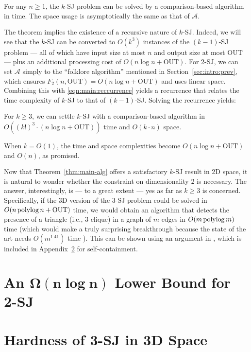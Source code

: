 \documentclass[sigconf]{acmart}
\def\vgap{\vspace{0mm}}
\def\A{\mathcal{A}}
\def\out{\mathrm{OUT}}
\begin{document}
\begin{theorem} \label{thm:main-recur}
    For any $n \ge 1$, the $k$-SJ problem can be solved by a comparison-based algorithm in
    \myeqn{
        O(k^3) \cdot \big( F_{k-1}(n, \out) + n \log n + \out \big)
        \label{eqn:main:reccurrence}
    }
    time.
    The space usage is asymptotically the same as that of $\A$.
\end{theorem}

The theorem implies the existence of a recursive nature of $k$-SJ. Indeed, we will see that the $k$-SJ can be converted to $O(k^3)$ instances of the $(k-1)$-SJ problem --- all of which have input size at most $n$ and output size at most $\out$ --- plus an additional processing cost of $O(n \log n + \out)$. For 2-SJ, we can set $\A$ simply to the ``folklore algorithm'' mentioned in Section~\ref{sec:intro:prev}, which ensures $F_2(n, \out) = O(n \log n + \out)$ and uses linear space. Combining this with \eqref{eqn:main:reccurrence} yields a recurrence that relates the time complexity of $k$-SJ to that of $(k-1)$-SJ. Solving the recurrence yields: 

\begin{theorem} \label{thm:main-alg}
    For $k \ge 3$, we can settle $k$-SJ with a comparison-based algorithm in $O( (k!)^3 \cdot (n \log n + \out))$ time and $O(k \cdot n)$ space.
\end{theorem}

When $k = O(1)$, the time and space complexities become $O(n \log n + \out)$ and $O(n)$, as promised.

\vgap 

Now that Theorem~\ref{thm:main-alg} offers a satisfactory $k$-SJ result in 2D space, it is natural to wonder whether the constraint on dimensionality 2 is necessary. The answer, interestingly, is --- to a great extent --- yes as far as $k \ge 3$ is concerned. Specifically, if the 3D version of the 3-SJ problem could be solved in $O(n \polylog n + \out)$ time, we would obtain an algorithm that detects the presence of a triangle (i.e., 3-clique) in a graph of $m$ edges in $O(m \operatorname*{polylog} m)$ time (which would make a truly surprising breakthrough because the state of the art needs $O(m^{1.41})$ time \cite{ayz97}). This can be shown using an argument in \cite{kcko22}, which is included in Appendix~\ref{app:lb-cond} for self-containment.



\balance

\appendix 

\section{An $\bm{\Omega(n \log n)}$ Lower Bound for 2-SJ} \label{app:lb}

\section{Hardness of 3-SJ in 3D Space} \label{app:lb-cond}

\end{document}
